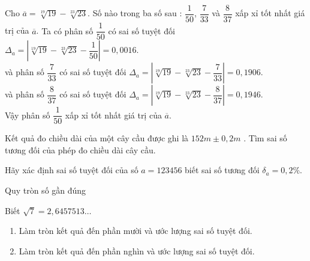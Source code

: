 \begin{vd}%
	Cho $\overline{a}=\sqrt[19]{19}-\sqrt[23]{23}$. Số nào trong ba số sau : $ \dfrac{1}{50} $, $ \dfrac{7}{33} $ và $ \dfrac{8}{37} $ xấp xỉ tốt nhất giá trị của  $\overline{a}$.
	\loigiai
	{
		Ta có phân số $ \dfrac{1}{50} $ có sai số tuyệt đối $ \Delta_a=\left|\sqrt[19]{19}-\sqrt[23]{23}-\dfrac{1}{50}\right| =0{,}0016 $.\\
		và phân số $ \dfrac{7}{33} $ có sai số tuyệt đối $ \Delta_a=\left|\sqrt[19]{19}-\sqrt[23]{23}-\dfrac{7}{33}\right| =0{,}1906 $.\\
		và phân số $ \dfrac{8}{37} $ có sai số tuyệt đối $ \Delta_a=\left|\sqrt[19]{19}-\sqrt[23]{23}-\dfrac{8}{37}\right| =0{,}1946 $.\\
		Vậy phân số $ \dfrac{1}{50} $ xấp xỉ tốt nhất giá trị của $\overline{a}$.
	}
\end{vd} 

\begin{vd}
	Kết quả đo chiều dài của một cây cầu được ghi là $152m\pm 0,2m$ . Tìm sai số tương đối của phép đo chiều dài cây cầu.
\end{vd} 

\begin{vd}
	Hãy xác định sai số tuyệt đối của số $ a=123456$ biết sai số tương đối $\delta_a=0,2\% $.
\end{vd} 



\begin{dang}{Quy tròn số gần đúng}
	
\end{dang}

\begin{vd}%
	Biết $ \sqrt{7}=2{,}6457513\ldots $
	\begin{enumerate}
		\item Làm tròn kết quả đến phần mười và ước lượng sai số tuyệt đối.
		\item Làm tròn kết quả đến phần nghìn và ước lượng sai số tuyệt đối.
	\end{enumerate}
\end{vd} 

